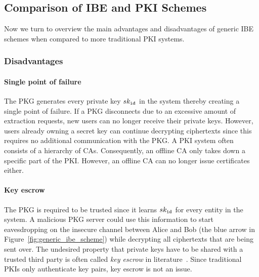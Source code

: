 \subsection{Comparison of IBE and PKI Schemes}
\label{sec:pros_and_cons_of_ibe}
Now we turn to overview the main advantages and disadvantages of generic IBE schemes when compared to more traditional PKI systems.

\subsubsection{Disadvantages}
\paragraph{Single point of failure}
The PKG generates every private key $sk_{\mathtt{id}_{}}$ in the system thereby creating a single point of failure. If a PKG disconnects due to an excessive amount of extraction requests, new users can no longer receive their private keys. However, users already owning a secret key can continue decrypting ciphertexts since this requires no additional communication with the PKG. A PKI system often consists of a hierarchy of CAs. Consequently, an offline CA only takes down a specific part of the PKI. However, an offline CA can no longer issue certificates either.

\paragraph{Key escrow}
The PKG is required to be trusted since it learns $sk_{\mathtt{id}_{}}$ for every entity in the system. A malicious PKG server could use this information to start eavesdropping on the insecure channel between Alice and Bob (the blue arrow in Figure~\ref{fig:generic_ibe_scheme}) while decrypting all ciphertexts that are being sent over. The undesired property that private keys have to be shared with a trusted third party is often called \textit{key escrow} in literature~\cite{art:AbelsonHARBMBJBMDWGJNGRLSISB97}. Since traditional PKIs only authenticate key pairs, key escrow is not an issue.

